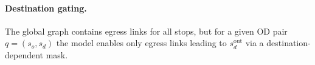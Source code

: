\paragraph{Destination gating.}
The global graph contains egress links for all stops, but for a given OD pair $q=(s_o,s_d)$
the model enables only egress links leading to $s_d^{\mathrm{out}}$ via a destination-dependent mask.

